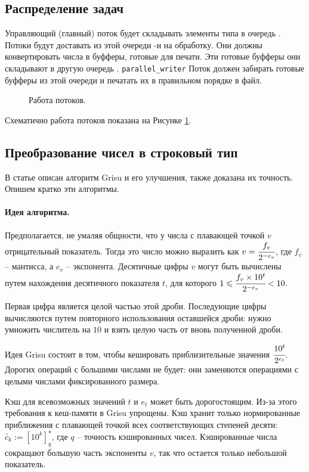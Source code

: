 \documentclass[a4paper, 12pt, twoside]{article}
\begin{document}
\subsection{Распределение задач}
Управляющий (главный) поток будет складывать элементы типа \texttt{} в очередь \texttt{}.
Потоки \texttt{} будут доставать из этой очереди \texttt{}-и на обработку.
Они должны конвертировать числа в буфферы, готовые для печати.
Эти готовые буфферы \texttt{} они складывают в другую очередь \texttt{}.
\texttt{\textcolor[rgb]{0.5,0,0}{parallel\_writer}}
Поток \texttt{} должен забирать готовые буфферы из этой очереди и печатать их в правильном порядке в файл.
\begin{figure}[h!]
\def\svgwidth{430pt}
  
  \caption{Работа потоков.} \label{draw}
\end{figure}

Схематично работа потоков показана на Рисунке \ref{draw}.

\subsection{Преобразование чисел в строковый тип}
В статье \cite{1} описан алгоритм \textsf{Grisu} и его улучшения, также доказана их точность.
Опишем кратко эти алгоритмы.
\paragraph{Идея алгоритма.}
Предполагается, не умаляя общности, что у числа с плавающей точкой $v$ отрицательный показатель. 
Тогда это число можно выразить как $v=\cfrac{f_v}{2^{-e_v}}$, где $f_v$ -- мантисса, а $e_v$ -- экспонента. 
Десятичные цифры $v$ могут быть вычислены путем нахождения десятичного показателя $t$, для которого $1 \leqslant \cfrac{f_v \times 10^t}{2^{-e_v}} < 10$.

Первая цифра является целой частью этой дроби. 
Последующие цифры вычисляются путем повторного использования оставшейся дроби: нужно умножить числитель на $10$ и взять целую часть от вновь полученной дроби.

Идея \textsf{Grisu} состоит в том, чтобы кешировать приблизительные значения $\cfrac{10^t}{2^{e_t}}$.
Дорогих операций с большими числами не будет: они заменяются операциями с целыми числами фиксированного размера.

Кэш для всевозможных значений $t$ и $e_t$ может быть дорогостоящим. 
Из-за этого требования к кеш-памяти в \textsf{Grisu} упрощены. 
Кэш хранит только нормированные приближения с плавающей точкой всех соответствующих степеней десяти: $\tilde{c_k} := \left[ 10^k \right]_q^{\star}$, где $q$ -- точность кэшированных чисел.
Кэшированные числа сокращают большую часть экспоненты $v$, так что остается только небольшой показатель. 
\end{document}
